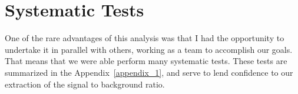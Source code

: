 \section{Systematic Tests}

One of the rare advantages of this analysis was that I had the opportunity to
undertake it in parallel with others, working as a team to accomplish our goals.
That means that we were able perform many systematic tests. These tests are
summarized in the Appendix~\ref{appendix_1}, and serve to lend confidence to our
extraction of the signal to background ratio.
